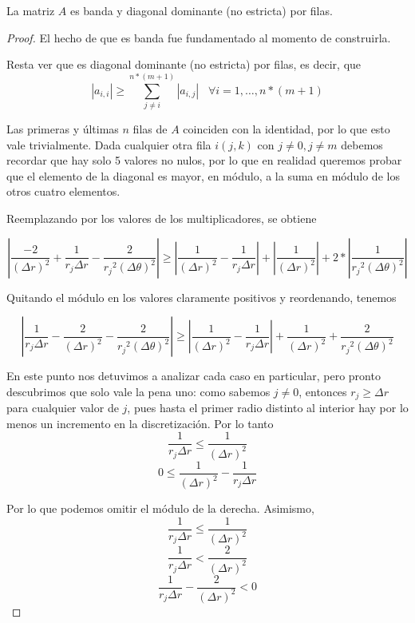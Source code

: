 \begin{proposition}

La matriz $A$ es banda y diagonal dominante (no estricta) por filas.

\begin{proof}

El hecho de que es banda fue fundamentado al momento de construirla.

Resta ver que es diagonal dominante (no estricta) por filas, es decir, que $$|a_{i, i}| \geq \sum\limits_{j \neq i}^{n*(m+1)} |a_{i, j}| \hspace{10pt} \forall i = 1, \ldots, n*(m+1)$$

Las primeras y últimas $n$ filas de $A$ coinciden con la identidad, por lo que esto vale trivialmente. Dada cualquier otra fila $i(j, k)$ con $j \neq 0, j \neq m$ debemos recordar que hay solo 5 valores no nulos, por lo que en realidad queremos probar que el elemento de la diagonal es mayor, en módulo, a la suma en módulo de los otros cuatro elementos.

Reemplazando por los valores de los multiplicadores, se obtiene

$$\left|\frac{-2}{(\Delta r)^2} + \frac{1}{r_j \Delta r} - \frac{2}{{r_j}^2 (\Delta \theta)^2}\right| \geq \left|\frac{1}{(\Delta r)^2} - \frac{1}{r_j \Delta r}\right| + \left|\frac{1}{(\Delta r)^2}\right| + 2 * \left|\frac{1}{{r_j}^2(\Delta \theta)^2}\right| $$

Quitando el módulo en los valores claramente positivos y reordenando, tenemos

$$\left|\frac{1}{r_j \Delta r} - \frac{2}{(\Delta r)^2} - \frac{2}{{r_j}^2 (\Delta \theta)^2}\right| \geq \left|\frac{1}{(\Delta r)^2} - \frac{1}{r_j \Delta r}\right| + \frac{1}{(\Delta r)^2} + \frac{2}{{r_j}^2(\Delta \theta)^2} $$

En este punto nos detuvimos a analizar cada caso en particular, pero pronto descubrimos que solo vale la pena uno:
como sabemos $j \neq 0$, entonces $r_j \geq \Delta r$ para cualquier valor de $j$, pues hasta el primer radio distinto al interior hay por lo menos un incremento en la discretización. Por lo tanto 
$$\frac{1}{r_j \Delta r} \leq \frac{1}{(\Delta r)^2}$$
$$0 \leq \frac{1}{(\Delta r)^2} - \frac{1}{r_j \Delta r}$$

Por lo que podemos omitir el módulo de la derecha. Asimismo, 
$$ \frac{1}{r_j \Delta r} \leq \frac{1}{(\Delta r)^2} $$
$$ \frac{1}{r_j \Delta r} < \frac{2}{(\Delta r)^2} $$
$$ \frac{1}{r_j \Delta r} - \frac{2}{(\Delta r)^2} < 0 $$


\end{proof}
\end{proposition}
